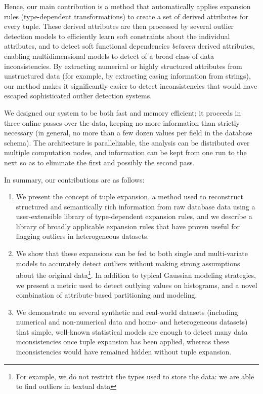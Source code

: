 Hence, our main contribution is a method that automatically applies expansion rules (type-dependent transformations) to create a set of derived attributes for every tuple. These derived attributes are then processed by several outlier detection models to efficiently learn soft constraints about the individual attributes, and to detect soft functional dependencies \textit{between} derived attributes, enabling multidimensional models to detect of a broad class of data inconsistencies. By extracting numerical or highly structured attributes from unstructured data (for example, by extracting casing information from strings), our method makes it significantly easier to detect inconsistencies that would have escaped sophisticated outlier detection systems.

We designed our system to be both fast and memory efficient; it proceeds in three online passes over the data, keeping no more information than strictly necessary (in general, no more than a few dozen values per field in the database schema). The architecture is parallelizable, the analysis can be distributed over multiple computation nodes, and information can be kept from one run to the next so as to eliminate the first and possibly the second pass.

In summary, our contributions are as follows:
\begin{enumerate}
\item We present the concept of tuple expansion, a method used to reconstruct structured and semantically rich information from raw database data using a user-extensible library of type-dependent expansion rules, and we describe a library of broadly applicable expansion rules that have proven useful for flagging outliers in heterogeneous datasets.
\item We show that these expansions can be fed to both single and multi-variate models to accurately detect outliers without making strong assumptions about the original data\footnote{For example, we do not restrict the types used to store the data: we are able to find outliers in textual data}. In addition to typical Gaussian modeling strategies, we present a metric used to detect outlying values on histograms, and a novel combination of attribute-based partitioning and modeling.
\item We demonstrate on several synthetic and real-world datasets (including numerical and non-numerical data and homo- and heterogeneous datasets) that simple, well-known statistical models are enough to detect many data inconsistencies once tuple expansion has been applied, whereas these inconsistencies would have remained hidden without tuple expansion.
\end{enumerate}

